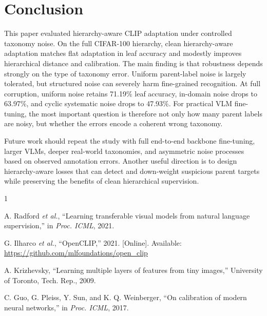 \documentclass[conference]{IEEEtran}
\begin{document}
\section{Conclusion}
This paper evaluated hierarchy-aware CLIP adaptation under controlled taxonomy
noise. On the full CIFAR-100 hierarchy, clean hierarchy-aware adaptation
matches flat adaptation in leaf accuracy and modestly improves hierarchical
distance and calibration. The main finding is that robustness depends strongly
on the type of taxonomy error. Uniform parent-label noise is largely tolerated,
but structured noise can severely harm fine-grained recognition. At full
corruption, uniform noise retains 71.19\% leaf accuracy, in-domain noise drops
to 63.97\%, and cyclic systematic noise drops to 47.93\%. For practical VLM
fine-tuning, the most important question is therefore not only how many parent
labels are noisy, but whether the errors encode a coherent wrong taxonomy.

Future work should repeat the study with full end-to-end backbone fine-tuning,
larger VLMs, deeper real-world taxonomies, and asymmetric noise processes based
on observed annotation errors. Another useful direction is to design
hierarchy-aware losses that can detect and down-weight suspicious parent
targets while preserving the benefits of clean hierarchical supervision.

\begin{thebibliography}{1}

A. Radford \emph{et al.}, ``Learning transferable visual models from natural
language supervision,'' in \emph{Proc. ICML}, 2021.

G. Ilharco \emph{et al.}, ``OpenCLIP,'' 2021. [Online]. Available:
\url{https://github.com/mlfoundations/open_clip}

A. Krizhevsky, ``Learning multiple layers of features from tiny images,''
University of Toronto, Tech. Rep., 2009.

C. Guo, G. Pleiss, Y. Sun, and K. Q. Weinberger, ``On calibration of modern
neural networks,'' in \emph{Proc. ICML}, 2017.

\end{thebibliography}
\end{document}

